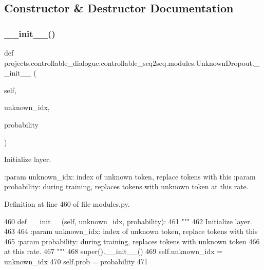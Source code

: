 \subsection{Constructor \& Destructor Documentation}
\mbox{\label{classprojects_1_1controllable__dialogue_1_1controllable__seq2seq_1_1modules_1_1UnknownDropout_a372e777d8028c259002dccd0477c6714}} 
\subsubsection{\texorpdfstring{\+\_\+\+\_\+init\+\_\+\+\_\+()}{\_\_init\_\_()}}
{\footnotesize\ttfamily def projects.\+controllable\+\_\+dialogue.\+controllable\+\_\+seq2seq.\+modules.\+Unknown\+Dropout.\+\_\+\+\_\+init\+\_\+\+\_\+ (\begin{DoxyParamCaption}\item[{}]{self,  }\item[{}]{unknown\+\_\+idx,  }\item[{}]{probability }\end{DoxyParamCaption})}

\begin{DoxyVerb}Initialize layer.

:param unknown_idx: index of unknown token, replace tokens with this
:param probability: during training, replaces tokens with unknown token
            at this rate.
\end{DoxyVerb}
 

Definition at line 460 of file modules.\+py.


\begin{DoxyCode}
460     \textcolor{keyword}{def }\_\_init\_\_(self, unknown\_idx, probability):
461         \textcolor{stringliteral}{"""}
462 \textcolor{stringliteral}{        Initialize layer.}
463 \textcolor{stringliteral}{}
464 \textcolor{stringliteral}{        :param unknown\_idx: index of unknown token, replace tokens with this}
465 \textcolor{stringliteral}{        :param probability: during training, replaces tokens with unknown token}
466 \textcolor{stringliteral}{                            at this rate.}
467 \textcolor{stringliteral}{        """}
468         super().\_\_init\_\_()
469         self.unknown\_idx = unknown\_idx
470         self.prob = probability
471 
\end{DoxyCode}



